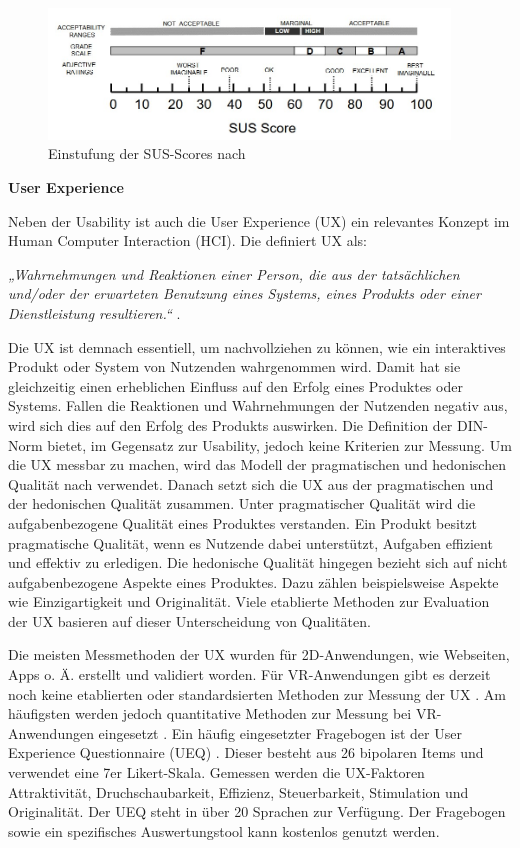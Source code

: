 \begin{figure}[tbh]
    \centering
    \includegraphics[width=0.95\textwidth]{images/SUS-Interpretation.jpg}
    \caption{Einstufung der SUS-Scores nach \citet{bangor_empirical_2008}}
    \label{fig:susInterpretation}
\end{figure}

\textbf{User Experience}

Neben der Usability ist auch die User Experience (UX) ein relevantes Konzept im Human Computer Interaction (HCI). Die \citet{DINISO9241} definiert UX als:

\textit{„Wahrnehmungen und Reaktionen einer Person, die aus der tatsächlichen und/oder der erwarteten Benutzung eines Systems, eines Produkts oder einer Dienstleistung resultieren.“} \cite{DINISO9241}. 

Die UX ist demnach essentiell, um nachvollziehen zu können, wie ein interaktives Produkt oder System von Nutzenden wahrgenommen wird. Damit hat sie gleichzeitig einen erheblichen Einfluss auf den Erfolg eines Produktes oder Systems. Fallen die Reaktionen und Wahrnehmungen der Nutzenden negativ aus, wird sich dies auf den Erfolg des Produkts auswirken. Die Definition der DIN-Norm bietet, im Gegensatz zur Usability, jedoch keine Kriterien zur Messung. Um die UX messbar zu machen, wird das Modell der pragmatischen und hedonischen Qualität nach \citet{hassenzahl_user_2008} verwendet. Danach setzt sich die UX aus der pragmatischen und der hedonischen Qualität zusammen. Unter pragmatischer Qualität wird die aufgabenbezogene Qualität eines Produktes verstanden. Ein Produkt besitzt pragmatische Qualität, wenn es Nutzende dabei unterstützt, Aufgaben effizient und effektiv zu erledigen. Die hedonische Qualität hingegen bezieht sich auf nicht aufgabenbezogene Aspekte eines Produktes. Dazu zählen beispielsweise Aspekte wie Einzigartigkeit und Originalität. Viele etablierte Methoden zur Evaluation der UX basieren auf dieser Unterscheidung von Qualitäten. 

Die meisten Messmethoden der UX wurden für 2D-Anwendungen, wie Webseiten, Apps o. Ä. erstellt und validiert worden. Für VR-Anwendungen gibt es derzeit noch keine etablierten oder standardsierten Methoden zur Messung der UX \citep{alexandrovsky_evaluating_2021}. Am häufigsten werden jedoch quantitative Methoden zur Messung bei VR-Anwendungen eingesetzt \citep{kim_systematic_2020}. Ein häufig eingesetzter Fragebogen ist der User Experience Questionnaire (UEQ) \citep{laugwitz_construction_2008}. Dieser besteht aus 26 bipolaren Items und verwendet eine 7er Likert-Skala. Gemessen werden die UX-Faktoren Attraktivität, Druchschaubarkeit, Effizienz, Steuerbarkeit, Stimulation und Originalität. Der UEQ steht in über 20 Sprachen zur Verfügung. Der Fragebogen sowie ein spezifisches Auswertungstool kann kostenlos genutzt werden. 

